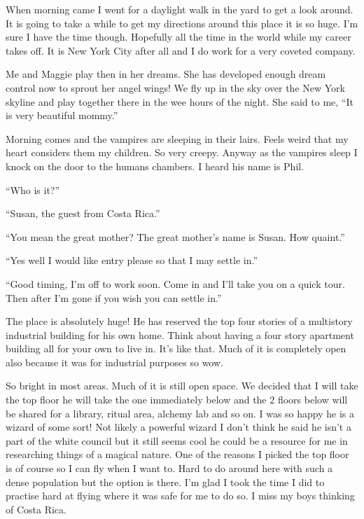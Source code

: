 When morning came I went for a daylight walk in the yard to get a look around. It is going to take a while to get my directions around this place it is so huge. I'm sure I have the time though. Hopefully all the time in the world while my career takes off. It is New York City after all and I do work for a very coveted company.

Me and Maggie play then in her dreams. She has developed enough dream control now to sprout her angel wings! We fly up in the sky over the New York skyline and play together there in the wee hours of the night. She said to me, ``It is very beautiful mommy.''

Morning comes and the vampires are sleeping in their lairs. Feels weird that my heart considers them my children. So very creepy. Anyway as the vampires sleep I knock on the door to the humans chambers. I heard his name is Phil.

``Who is it?''

``Susan, the guest from Costa Rica.''

``You mean the great mother? The great mother's name is Susan. How quaint.''

``Yes well I would like entry please so that I may settle in.''

``Good timing, I'm off to work soon. Come in and I'll take you on a quick tour. Then after I'm gone if you wish you can settle in.''

The place is absolutely huge! He has reserved the top four stories of a multistory industrial building for his own home. Think about having a four story apartment building all for your own to live in. It's like that. Much of it is completely open also because it was for industrial purposes so wow.

So bright in most areas. Much of it is still open space. We decided that I will take the top floor he will take the one immediately below and the 2 floors below will be shared for a library, ritual area, alchemy lab and so on. I was so happy he is a wizard of some sort! Not likely a powerful wizard I don't think he said he isn't a part of the white council but it still seems cool he could be a resource for me in researching things of a magical nature. One of the reasons I picked the top floor is of course so I can fly when I want to. Hard to do around here with such a dense population but the option is there. I'm glad I took the time I did to practise hard at flying where it was safe for me to do so. I miss my boys thinking of Costa Rica.
 
